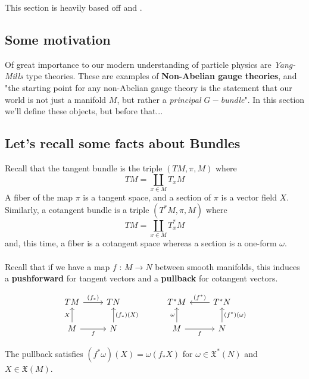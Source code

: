 \documentclass[11pt]{article}
\begin{document}
\begin{bluebox}
    This section is heavily based off \cite{SchullerGeomAnatomy} and \cite{SkinnerAQFT}.
\end{bluebox}

\subsection{Some motivation}
Of great importance to our modern understanding of particle physics are \emph{Yang-Mills} type theories. These are examples of \textbf{Non-Abelian gauge theories}, and "the starting point for any non-Abelian gauge theory is the statement that our world is not just a manifold $M$, but rather a \emph{principal $G-$bundle}"\cite{SkinnerAQFT}. In this section we'll define these objects, but before that...

\subsection*{Let's recall some facts about Bundles}

Recall that the tangent bundle is the triple $(TM, \pi, M)$ where \[ TM = \coprod_{x \in M} T_x M \] A fiber of the map $\pi$ is a tangent space, and a section of $\pi$ is a vector field $X$. Similarly, a cotangent bundle is a triple $(T^*M, \pi, M)$ where \[ TM = \coprod_{x \in M} T_x^* M \] and, this time, a fiber is a cotangent space whereas a section is a one-form $\omega$.
\\
\\
Recall that if we have a map $f \text{ : } M \rightarrow N$ between smooth manifolds, this induces a \textbf{pushforward} for tangent vectors and a \textbf{pullback} for cotangent vectors.

\begin{center}
    \[ \begin{tikzcd}
	TM & TN && {T^*M} & {T^*N} \\
	M & N && M & N
	\arrow["{(f_*)}", from=1-1, to=1-2]
	\arrow["{(f^*)}"', from=1-5, to=1-4]
	\arrow["X", from=2-1, to=1-1]
	\arrow["f"', from=2-1, to=2-2]
	\arrow["{(f_*)(X)}"', from=2-2, to=1-2]
	\arrow["\omega", from=2-4, to=1-4]
	\arrow["f"', from=2-4, to=2-5]
	\arrow["{(f^*)(\omega)}"', from=2-5, to=1-5]
\end{tikzcd} \]
\end{center}

The pullback satisfies $(f^*\omega)(X) = \omega(f_* X)$ for $\omega \in \mathfrak{X}^{*}(N)$ and $X \in \mathfrak{X}(M)$.
\end{document}
